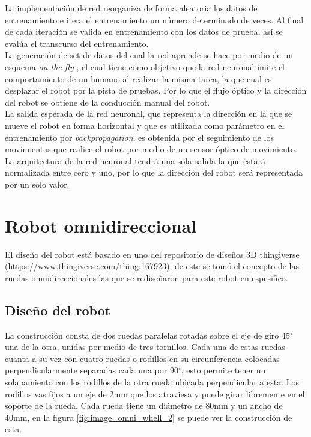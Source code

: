 \documentclass{iccmemoria}
\begin{document}
La implementación de red reorganiza de forma aleatoria los datos de entrenamiento e itera el entrenamiento un número determinado de veces. Al final de cada iteración se valida en entrenamiento con los datos de prueba, así se evalúa el transcurso del entrenamiento.\\

La generación de set de datos del cual la red aprende se hace por medio de un esquema \emph{on-the-fly} \cite{pomerleau1989alvinn}, el cual tiene como objetivo que la red neuronal imite el comportamiento de un humano al realizar la misma tarea, la que cual es desplazar el robot por la pista de pruebas. Por lo que el flujo óptico y la dirección del robot se obtiene de la conducción manual del robot.\\

La salida esperada de la red neuronal, que representa la dirección en la que se mueve el robot en forma horizontal y que es utilizada como parámetro en el entrenamiento por \emph{backpropagation}, es obtenida por el seguimiento de los movimientos que realice el robot por medio de un sensor óptico de movimiento. La arquitectura de la red neuronal tendrá una sola salida la que estará normalizada entre cero y uno, por lo que la dirección del robot será representada por un solo valor.\\

\section{Robot omnidireccional}

El diseño del robot está basado en uno del repositorio de diseños 3D thingiverse (https://www.thingiverse.com/thing:167923), de este se tomó el concepto de las ruedas omnidireccionales las que se rediseñaron para este robot en espesifico.\\

\subsection{Diseño del robot}

La construcción consta de dos ruedas paralelas rotadas sobre el eje de giro 45$^{\circ}$ una de la otra, unidas por medio de tres tornillos. Cada una de estas ruedas cuanta a su vez con cuatro ruedas o rodillos en su circunferencia colocadas perpendicularmente separadas cada una por 90$^{\circ}$, esto permite tener un solapamiento con los rodillos de la otra rueda ubicada perpendicular a esta. Los rodillos vas fijos a un eje de 2mm que los atraviesa y puede girar libremente en el soporte de la rueda. Cada rueda tiene un diámetro de 80mm y un ancho de 40mm, en la figura \ref{fig:image_omni_whell_2} se puede ver la construcción de esta.\\
\end{document}
